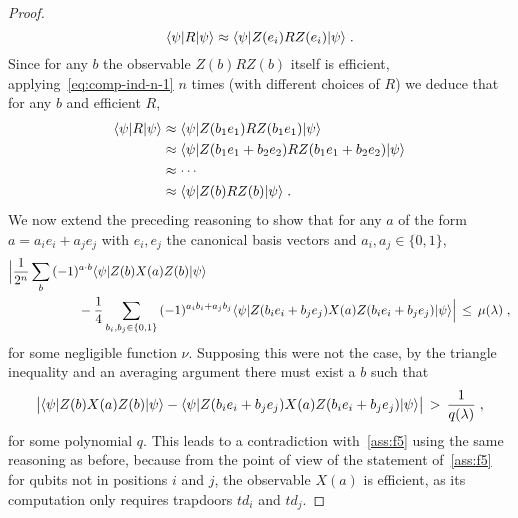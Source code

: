 \begin{proof}
\begin{equation}\label{eq:comp-ind-n-1}
\langle\psi|R |\psi\rangle \approx \langle\psi| Z(e_i)RZ(e_i)|\psi\rangle\;.
\end{equation}
 Since for any $b$ the observable $Z(b)RZ(b)$ itself is efficient, applying~\eqref{eq:comp-ind-n-1} $n$ times (with different choices of $R$) we deduce that for any $b$ and efficient $R$, 
\begin{align*} 
\langle\psi| R |\psi\rangle &\approx \langle\psi| Z(b_1e_1) R Z(b_1e_1) |\psi\rangle\\
&\approx \langle\psi| Z(b_1e_1+b_2e_2) R Z(b_1e_1+b_2e_2) |\psi\rangle\\
&\approx \cdots\\
&\approx \langle\psi| Z(b) R Z(b)|\psi\rangle\;.
\end{align*}
We now extend the preceding reasoning to show that for any $a$ of the form $a = a_i e_i + a_j e_j$ with $e_i,e_j$ the canonical basis vectors and $a_i,a_j\in\{0,1\}$,
\begin{align}
 \Big| \frac{1}{2^n} \sum_b \, &(-1)^{a\cdot b} \langle\psi| Z(b) X(a) Z(b) |\psi\rangle  \notag\\
&\qquad -  \frac{1}{4} \sum_{b_i,b_j\in \{0,1\}}\,  (-1)^{a_ib_i+a_jb_j} \langle\psi| Z(b_i e_i + b_j e_j) X(a) Z(b_i e_i + b_j e_j) |\psi\rangle\Big|\,\leq\,\mu(\lambda) \;,\label{eq:comp-ind-nqubits}
	\end{align}
	for some negligible function $\nu$. Supposing this were not the case, by the triangle inequality and an averaging argument there must exist a $b$ such that 
	\[ \big| \langle\psi| Z(b) X(a) Z(b) |\psi\rangle - \langle\psi| Z(b_i e_i + b_j e_j) X(a) Z(b_i e_i + b_j e_j) |\psi\rangle\big| \, > \, \frac{1}{q(\lambda)}\;,\]
	for some polynomial $q$. This leads to a contradiction with~\ref{ass:f5} using the same reasoning as before, because from the point of view of the statement of~\ref{ass:f5} for qubits not in positions $i$ and $j$, the observable $X(a)$ is efficient, as its computation only requires trapdoors $td_i$ and $td_j$. 
	

\end{proof}
